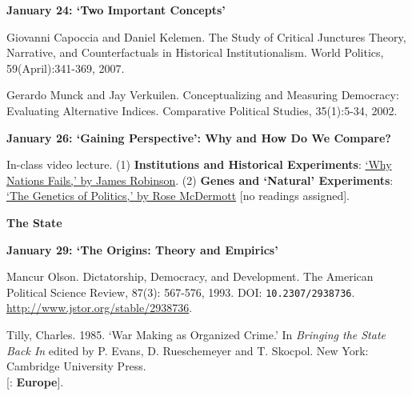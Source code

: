 \documentclass[letterpaper]{article}
\renewenvironment{itemize}{
  \begin{list}{}{
    \setlength{\leftmargin}{1.5em}
  }
}{
  \end{list}
}
\begin{document}
\begin{enumerate}
\begin{itemize}
		\item {\bf January 24: `Two Important Concepts'}
			\begin{itemize}	
				\item[$\bullet$] Giovanni Capoccia and Daniel Kelemen. The Study of Critical Junctures Theory, Narrative, and Counterfactuals in Historical Institutionalism. World Politics, 59(April):341-369, 2007.
				\item[$\bullet$] Gerardo Munck and Jay Verkuilen. Conceptualizing and Measuring Democracy: Evaluating Alternative Indices. Comparative Political Studies, 35(1):5-34, 2002.
			\end{itemize}



		\item {\bf January 26: `Gaining Perspective': Why and How Do We Compare?}
			\begin{itemize}	
				\item[$\bullet$] In-class video lecture. (1) {\bf Institutions and Historical Experiments}: \href{https://www.youtube.com/watch?v=jsZDlBU36n0}{`Why Nations Fails,' by James Robinson}. (2) {\bf Genes and `Natural' Experiments}: \href{https://www.youtube.com/watch?v=mVVeCOuh7FQ}{`The Genetics of Politics,' by Rose McDermott} [no readings assigned].
			\end{itemize}

	\end{itemize}


\item {\bf The State}
	\begin{itemize}
		
	\item {\bf January 29: `The Origins: Theory and Empirics'}
		\begin{itemize} 
			\item[$\bullet$] Mancur Olson. Dictatorship, Democracy, and Development. The American Political Science Review, 87(3): 567-576, 1993. DOI: \texttt{10.2307/2938736}. \url{http://www.jstor.org/stable/2938736}.
			\item[$\bullet$] Tilly, Charles. 1985. `War Making as Organized Crime.' In \emph{Bringing the State Back In} edited by P. Evans, D. Rueschemeyer and T. Skocpol. New York: Cambridge University Press.\\
			{\color{brown}[\faGlobe: {\bf Europe}].}
		\end{itemize}
		


\end{itemize}
\end{enumerate}
\end{document}
